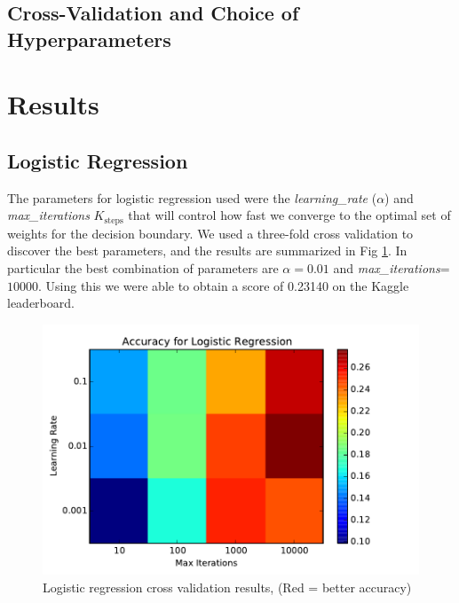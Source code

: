 \documentclass[conference]{IEEEtran}
\begin{document}
\subsection{Cross-Validation and Choice of Hyperparameters}

\section{Results}


\subsection{Logistic Regression}
The parameters for logistic regression used were the \emph{learning\_rate} ($\alpha$) and \emph{max\_iterations} $K_{\text{steps}}$ that will control how fast we converge to the optimal set of weights for the decision boundary. We used a three-fold cross validation to discover the best parameters, and the results are summarized in Fig \ref{LR_accuracy}. In particular the best combination of parameters are $\alpha=0.01$ and \emph{max\_iterations}=$10000$. Using this we were able to obtain a score of 0.23140 on the Kaggle leaderboard.

\begin{figure}[h]
	\centering
	\includegraphics[scale=0.50]{LR_accuracy.pdf}
	\caption{Logistic regression cross validation results, (Red = better accuracy)}
		\label{LR_accuracy}

\end{figure}
\end{document}
